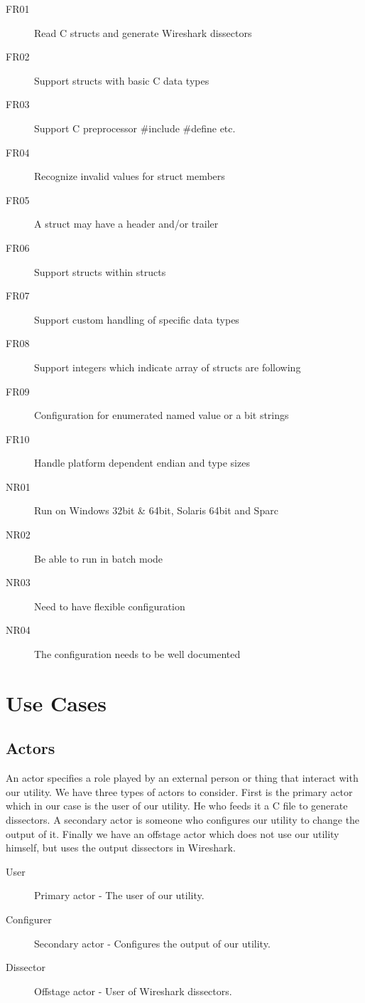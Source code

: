 \begin{description}
    \item[FR01] Read C structs and generate Wireshark dissectors
	\item[FR02] Support structs with basic C data types
	\item[FR03] Support C preprocessor \#include \#define etc.
	\item[FR04] Recognize invalid values for struct members
	\item[FR05] A struct may have a header and/or trailer
	\item[FR06] Support structs within structs
	\item[FR07] Support custom handling of specific data types
	\item[FR08] Support integers which indicate array of structs are following
	\item[FR09] Configuration for enumerated named value or a bit strings
	\item[FR10] Handle platform dependent endian and type sizes
	\item[NR01] Run on Windows 32bit \& 64bit, Solaris 64bit and Sparc
	\item[NR02] Be able to run in batch mode
	\item[NR03] Need to have flexible configuration
	\item[NR04] The configuration needs to be well documented
\end{description}

\section{Use Cases}
\label{sec:usecases}

\subsection{Actors}
An actor specifies a role played by an external person or thing that interact
with our utility. We have three types of actors to consider. First is the
primary actor which in our case is the user of our utility. He who feeds it a
C file to generate dissectors. A secondary actor is someone who configures our
utility to change the output of it. Finally we have an offstage actor which
does not use our utility himself, but uses the output dissectors in Wireshark.

\begin{description}
	\item[User] Primary actor - The user of our utility.
	\item[Configurer] Secondary actor - Configures the output of our utility.
	\item[Dissector] Offstage actor - User of Wireshark dissectors.
\end{description}

